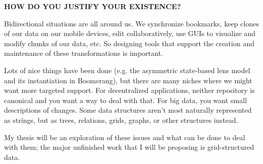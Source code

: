 \documentclass{article}
\begin{document}
{\bf HOW DO YOU JUSTIFY YOUR EXISTENCE?}

Bidirectional situations are all around us. We synchronize bookmarks, keep
clones of our data on our mobile devices, edit collaboratively, use GUIs to
visualize and modify chunks of our data, etc. So designing tools that
support the creation and maintenance of these transformations is important.

Lots of nice things have been done (e.g. the asymmetric state-based lens
model and its instantiation in Boomerang), but there are many niches where
we might want more targeted support. For decentralized applications, neither
repository is canonical and you want a way to deal with that. For big data,
you want small descriptions of changes. Some data structures aren't most
naturally represented as strings, but as trees, relations, grids, graphs, or
other structures instead.

My thesis will be an exploration of these issues and what can be done to
deal with them; the major unfinished work that I will be proposing is
grid-structured data.
\end{document}
